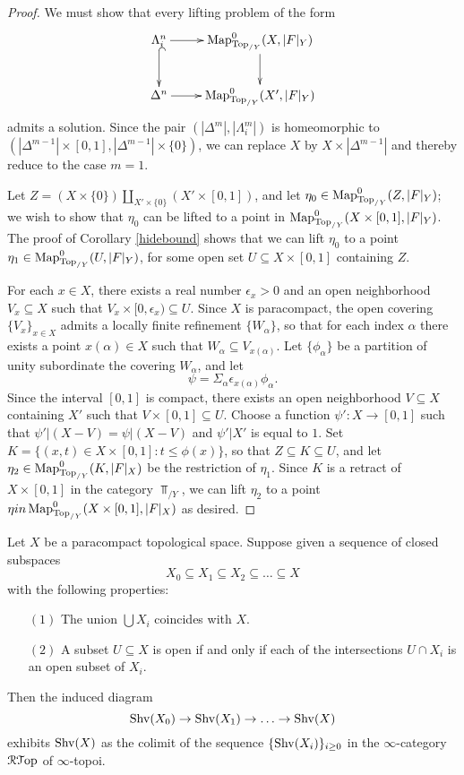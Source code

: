 \begin{proof}
We must show that every lifting problem of the form
$$ \xymatrix{ \Lambda^{n}_i \ar[r] \ar@{^{(}->}[d] &  \bHom^{0}_{ \Top_{/Y}}( X, |F|_Y ) \ar[d] \\
\Delta^n \ar[r] & \bHom^{0}_{ \Top_{/Y}}( X', |F|_Y ) }$$
admits a solution. Since the pair $( |\Delta^m|, |\Lambda^m_i|)$ is homeomorphic to
$( |\Delta^{m-1}| \times [0,1], | \Delta^{m-1} | \times \{0\})$, we can replace $X$ by
$X \times | \Delta^{m-1} |$ and thereby reduce to the case $m=1$.

Let $Z = ( X \times \{0\} ) \coprod_{ X' \times \{0\} } (X' \times [0,1] )$, and let
$\eta_0 \in \operatorname{{Map}}^{0}_{ \operatorname{Top}_{/Y}}( Z, |F|_Y)$; we wish to show that 
$\eta_0$ can be lifted to a point in $\operatorname{{Map}}^{0}_{ \operatorname{Top}_{/Y}}( X \times [0,1], |F|_Y)$.
The proof of Corollary \ref{hidebound} shows that we can lift
$\eta_0$ to a point $\eta_1 \in \operatorname{{Map}}^{0}_{ \operatorname{Top}_{/Y}}( U, |F|_Y)$, for some open set
$U \subseteq X \times [0,1]$ containing $Z$. 

For each $x \in X$, there exists a real number $\epsilon_x > 0$ and an open neighborhood
$V_x \subseteq X$ such that $V_x \times [0, \epsilon_x) \subseteq U$. 
Since $X$ is paracompact, the open covering $\{ V_x \}_{x \in X}$ admits a locally
finite refinement $\{ W_{\alpha} \}$, so that for each index $\alpha$ there
exists a point $x(\alpha) \in X$ such that $W_{\alpha} \subseteq V_{x(\alpha)}$.
Let $\{ \phi_{\alpha} \}$ be a partition of unity subordinate the covering $W_{\alpha}$, and let
$$ \psi = \Sigma_{ \alpha} \epsilon_{x(\alpha)} \phi_{\alpha}.$$
Since the interval $[0,1]$ is compact, there exists an open neighborhood
$V \subseteq X$ containing $X'$ such that $V \times [0,1] \subseteq U$.
Choose a function $\psi': X \rightarrow [0,1]$ such that
$\psi' | (X-V) = \psi|(X-V)$ and $\psi' | X'$ is equal to $1$. Set
$K = \{ (x,t) \in X \times [0,1]: t \leq \phi(x) \}$, so that
$Z \subseteq K \subseteq U$, and let $\eta_2 \in \operatorname{{Map}}^{0}_{ \operatorname{Top}_{/Y}}(K, |F|_X)$ be the 
restriction of $\eta_1$. Since $K$ is a retract of $X \times [0,1]$ in the category
$\Top_{/Y}$, we can lift $\eta_2$ to a point $\eta in \operatorname{{Map}}^{0}_{ \operatorname{Top}_{/Y}}( X \times [0,1], |F|_X)$ as desired.
\end{proof}

\begin{proposition}\label{siegland}
Let $X$ be a paracompact topological space. Suppose given a sequence of closed subspaces
$$ X_0 \subseteq X_1 \subseteq X_2 \subseteq \ldots \subseteq X$$
with the following properties:
\begin{itemize}
\item[$(1)$] The union $\bigcup X_{i}$ coincides with $X$.
\item[$(2)$] A subset $U \subseteq X$ is open if and only if each of the intersections
$U \cap X_i$ is an open subset of $X_i$.
\end{itemize}
Then the induced diagram
$$ \operatorname{Shv}(X_0) \rightarrow
\operatorname{Shv}(X_1) \rightarrow \ldots
\rightarrow \operatorname{Shv}(X)$$
exhibits $\operatorname{Shv}(X)$ as the colimit of the sequence $\{ \operatorname{Shv}(X_i) \}_{i \geq 0}$ in the 
$\infty$-category $\operatorname{\mathcal{R}{\mathcal T}op}$ of $\infty$-topoi.
\end{proposition}

